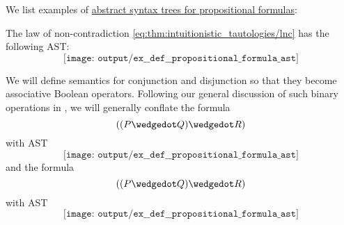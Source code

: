 \begin{example}\label{ex:def:propositional_fomula_ast}
  We list examples of \hyperref[def:propositional_fomula_ast]{abstract syntax trees for propositional formulas}:
  \begin{thmenum}
     The law of non-contradiction \eqref{eq:thm:intuitionistic_tautologies/lnc} has the following AST:
    \begin{equation*}
      \texttt{[image: output/ex\_\_def\_\_propositional\_formula\_ast]}
    \end{equation*}

     We will define semantics for conjunction and disjunction so that they become associative Boolean operators. Following our general discussion of such binary operations in , we will generally conflate the formula
    \begin{equation*}
      ((P \synwedge Q) \synwedge R)
    \end{equation*}
    with AST
    \begin{equation*}
      \texttt{[image: output/ex\_\_def\_\_propositional\_formula\_ast]}
    \end{equation*}
    and the formula
    \begin{equation*}
      ((P \synwedge Q) \synwedge R)
    \end{equation*}
    with AST
    \begin{equation*}
      \texttt{[image: output/ex\_\_def\_\_propositional\_formula\_ast]}
    \end{equation*}
  \end{thmenum}
\end{example}

